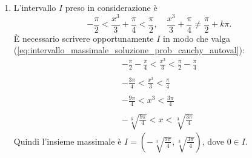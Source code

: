 \begin{example}
\begin{enumerate}
\begin{enumerate}
			\paragraph{Intermezzo: Dove considero la soluzione?} (\ref{eq:soluzione_prob_cauchy_autoval}) è l'espressione determinata attraverso la relazione (\ref{eq:sistema_cond_iniziale}). $\tan$ deve essere diversa da $\frac{\pi}{2}+k\pi$. Noi ricerchiamo il più ampio intervallo dove (\ref{eq:soluzione_prob_cauchy_autoval}) è definita e dove $y(x)$ ha come immagine il dato iniziale. Quindi $\frac{x^3}{3}+\frac{\pi}{4}$ deve essere diverso da $\frac{\pi}{2}+k\pi$ affinché la tangente esista ed è necessario considerare l'intervallo contente 0, ovvero è necessario considerare \ref{eq:intervallo_massimale_soluzione_prob_cauchy_autoval}.$\qed$
			\item L'intervallo $I$ preso in considerazione è
			\begin{equation}\label{eq:intervallo_massimale_soluzione_prob_cauchy_autoval}
				-\frac{\pi}{2}<\frac{x^3}{3}+\frac{\pi}{4}<\frac{\pi}{2},\quad \frac{x^3}{3}+\frac{\pi}{4}\neq \frac{\pi}{2}+k\pi.
			\end{equation}
			È necessario scrivere opportunamente $I$ in modo che valga (\ref{eq:intervallo_massimale_soluzione_prob_cauchy_autoval}):
			\begin{equation*}
				\begin{matrix}
					-\frac{\pi}{2} - \frac{\pi}{4} < \frac{x^3}{3} < \frac{\pi}{2} - \frac{\pi}{4}\\\\
					-\frac{3\pi}{4}<\frac{x^3}{3} < \frac{\pi}{4}\\\\
					-\frac{9\pi}{4} < x^3 < \frac{3\pi}{4}\\\\
					-\sqrt[3]{\frac{9\pi}{4}} < x < \sqrt[3]{\frac{3\pi}{4}}
				\end{matrix}
			\end{equation*}
			Quindi l'insieme massimale è $I=\left(-\sqrt[3]{\frac{9\pi}{4}} ,\sqrt[3]{\frac{3\pi}{4}}\right)$, dove $0\in I$.
		\end{enumerate}
		

\end{enumerate}
\end{example}
